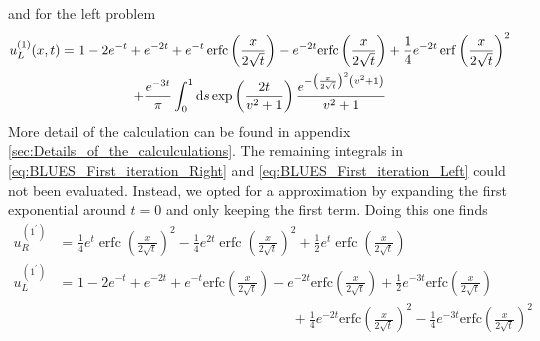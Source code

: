 \documentclass[amsmath,amssymb,amsfonts,aps,pre,preprint,superscriptaddress,bibnotes,showpacs,showkeys,longbibliography]{revtex4-1}
\DeclareMathOperator{\erfc}{erfc}
\begin{document}
and for the left problem
\begin{multline}\label{eq:BLUES_First_iteration_Left}
    u^{(1)}_L(x,t) =1-2 e^{-t}+e^{-2 t}+e^{-t} \erfc\left(\frac{x}{2 \sqrt{t}}\right)-e^{-2 t} \text{erfc}\left(\frac{x}{2 \sqrt{t}}\right)+\frac{1}{4} e^{-2 t} \erf\left(\frac{x}{2 \sqrt{t}}\right)^2
    \\+\frac{e^{-3 t}}{\pi } \int_0^1 \dd{s}\exp \left(\frac{2 t}{v^2+1}\right)\frac{ e^{-\left(\frac{x}{2 \sqrt{t}}\right)^2\left(v^2+1\right) }}{v^2+1}
\end{multline} %
More detail of the calculation can be found in appendix \ref{sec:Details_of_the_calculculations}. The remaining integrals in \eqref{eq:BLUES_First_iteration_Right} and \eqref{eq:BLUES_First_iteration_Left} could not been evaluated. Instead, we opted for a approximation by expanding the first exponential around $t=0$ and only keeping the first term. Doing this one finds
\begin{align}
    u^{(1^\prime)}_R 
    &= \frac{1}{4} e^t \erfc\left(\frac{x}{2 \sqrt{t}}\right)^2-\frac{1}{4} e^{2 t} \erfc\left(\frac{x}{2 \sqrt{t}}\right)^2+\frac{1}{2} e^t \erfc\left(\frac{x}{2 \sqrt{t}}\right)\\
    u^{(1^\prime)}_L
    &=1-2 e^{-t}+e^{-2 t}+e^{-t} \text{erfc}\left(\frac{x}{2 \sqrt{t}}\right)-e^{-2 t} \text{erfc}\left(\frac{x}{2 \sqrt{t}}\right)+\frac{1}{2} e^{-3 t} \text{erfc}\left(\frac{x}{2 \sqrt{t}}\right)\\
    &\hspace{7cm}+\frac{1}{4} e^{-2 t} \text{erfc}\left(\frac{x}{2 \sqrt{t}}\right)^2-\frac{1}{4} e^{-3 t} \text{erfc}\left(\frac{x}{2 \sqrt{t}}\right)^2
\end{align}
\end{document}
